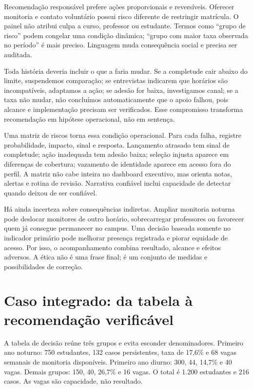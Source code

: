 Recomendação responsável prefere ações proporcionais e reversíveis. Oferecer monitoria e contato voluntário possui risco diferente de restringir matrícula. O painel não atribui culpa a curso, professor ou estudante. Termos como ``grupo de risco'' podem congelar uma condição dinâmica; ``grupo com maior taxa observada no período'' é mais preciso. Linguagem muda consequência social e precisa ser auditada.

Toda história deveria incluir o que a faria mudar. Se a completude cair abaixo do limite, suspendemos comparação; se entrevistas indicarem que horários são incompatíveis, adaptamos a ação; se adesão for baixa, investigamos canal; se a taxa não mudar, não concluímos automaticamente que o apoio falhou, pois alcance e implementação precisam ser verificados. Esse compromisso transforma recomendação em hipótese operacional, não em sentença.

Uma matriz de riscos torna essa condição operacional. Para cada falha, registre probabilidade, impacto, sinal e resposta. Lançamento atrasado tem sinal de completude; ação inadequada tem adesão baixa; seleção injusta aparece em diferenças de cobertura; vazamento de identidade aparece em acesso fora do perfil. A matriz não cabe inteira no dashboard executivo, mas orienta notas, alertas e rotina de revisão. Narrativa confiável inclui capacidade de detectar quando deixou de ser confiável.

Há ainda incerteza sobre consequências indiretas. Ampliar monitoria noturna pode deslocar monitores de outro horário, sobrecarregar professores ou favorecer quem já consegue permanecer no campus. Uma decisão baseada somente no indicador primário pode melhorar presença registrada e piorar equidade de acesso. Por isso, o acompanhamento combina resultado, alcance e efeitos adversos. A ética não é uma frase final; é um conjunto de medidas e possibilidades de correção.

\section{Caso integrado: da tabela à recomendação verificável}

A tabela de decisão reúne três grupos e evita esconder denominadores. Primeiro ano noturno: 750 estudantes, 132 casos persistentes, taxa de 17,6\% e 68 vagas semanais de monitoria disponíveis. Primeiro ano diurno: 300, 44, 14,7\% e 40 vagas. Demais grupos: 150, 40, 26,7\% e 16 vagas. O total é 1.200 estudantes e 216 casos. As vagas são capacidade, não resultado.

